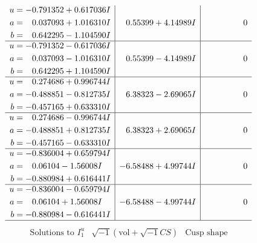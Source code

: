 \documentclass[1p]{elsarticle_modified}
\theoremstyle{definition}
\newcommand{\I}{\sqrt{-1}}
\begin{document}
$$\begin{array}{c|c|c}
\begin{aligned}
u &= -0.791352 + 0.617036 I \\
a &= \phantom{-}0.037093 + 1.016310 I \\
b &= \phantom{-}0.642295 - 1.104590 I\end{aligned}
 & \phantom{-}0.55399 + 4.14989 I & \phantom{-0.000000 } 0 \\ \hline\begin{aligned}
u &= -0.791352 - 0.617036 I \\
a &= \phantom{-}0.037093 - 1.016310 I \\
b &= \phantom{-}0.642295 + 1.104590 I\end{aligned}
 & \phantom{-}0.55399 - 4.14989 I & \phantom{-0.000000 } 0 \\ \hline\begin{aligned}
u &= \phantom{-}0.274686 + 0.996744 I \\
a &= -0.488851 - 0.812735 I \\
b &= -0.457165 + 0.633310 I\end{aligned}
 & \phantom{-}6.38323 - 2.69065 I & \phantom{-0.000000 } 0 \\ \hline\begin{aligned}
u &= \phantom{-}0.274686 - 0.996744 I \\
a &= -0.488851 + 0.812735 I \\
b &= -0.457165 - 0.633310 I\end{aligned}
 & \phantom{-}6.38323 + 2.69065 I & \phantom{-0.000000 } 0 \\ \hline\begin{aligned}
u &= -0.836004 + 0.659794 I \\
a &= \phantom{-}0.06104 - 1.56008 I \\
b &= -0.880984 + 0.616441 I\end{aligned}
 & -6.58488 + 4.99744 I & \phantom{-0.000000 } 0 \\ \hline\begin{aligned}
u &= -0.836004 - 0.659794 I \\
a &= \phantom{-}0.06104 + 1.56008 I \\
b &= -0.880984 - 0.616441 I\end{aligned}
 & -6.58488 - 4.99744 I & \phantom{-0.000000 } 0\\
 \hline 
 \end{array}$$\newpage$$\begin{array}{c|c|c}  
\text{Solutions to }I^u_{1}& \I (\text{vol} + \sqrt{-1}CS) & \text{Cusp shape}\\
 \hline 
\begin{aligned}

\end{aligned}
\end{array}$$
\end{document}
